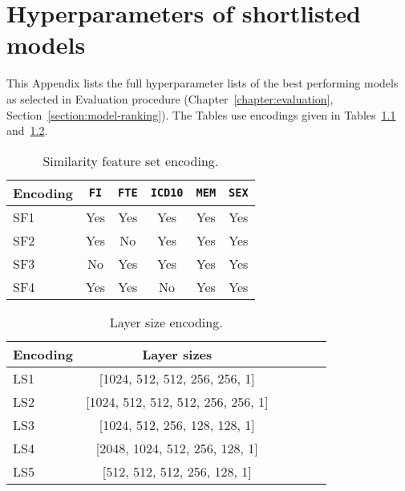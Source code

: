 \chapter{Hyperparameters of shortlisted models}
\label{appendix:hyperparameters}

This Appendix lists the full hyperparameter lists of the best performing models as selected in Evaluation procedure (Chapter~\ref{chapter:evaluation}, Section~\ref{section:model-ranking}). The Tables use encodings given in Tables~\ref{table:sf-encoding} and~\ref{table:ls-encoding}.

\begin{table}[h]
    \caption{Similarity feature set encoding.}\label{table:sf-encoding}
    \centering
    \small
    \begin{tabular}{lccccc}
        \hline
    \textbf{Encoding} & \texttt{FI} &  \texttt{FTE}& \texttt{ICD10}& \texttt{MEM}& \texttt{SEX}\\  \hline
        SF1 & Yes & Yes & Yes & Yes & Yes \\
        SF2 & Yes & No & Yes & Yes & Yes \\
        SF3 & No & Yes & Yes & Yes & Yes \\
        SF4 & Yes & Yes & No & Yes & Yes \\ \hline
\end{tabular}
\end{table}

\begin{table}[h]
    \caption{Layer size encoding.}\label{table:ls-encoding}
    \centering
    \small
    \begin{tabular}{lccccc}
        \hline
    \textbf{Encoding} & \textbf{Layer sizes} \\  \hline
        LS1 & [1024, 512, 512, 256, 256, 1] \\ 
        LS2 & [1024, 512, 512, 512, 256, 256, 1] \\
        LS3 & [1024, 512, 256, 128, 128, 1] \\
        LS4 & [2048, 1024, 512, 256, 128, 1] \\
        LS5 & [512, 512, 512, 256, 128, 1] \\ \hline
\end{tabular}
\end{table}

